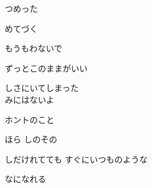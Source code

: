 つめった

 めてづく

もうもわないで

ずっとこのままがいい

しさにいてしまった
\\

みにはないよ

 ホントのこと

ほら しのその

しだけれてても すぐにいつものような

なになれる
\\
